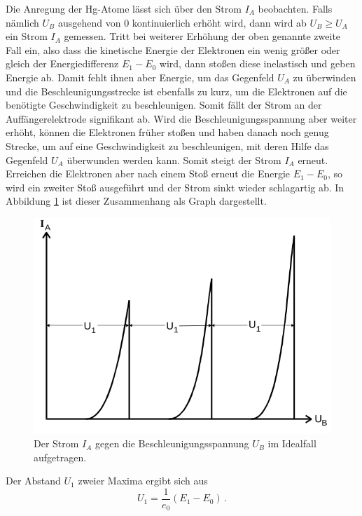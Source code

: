 Die Anregung der Hg-Atome lässt sich über den Strom $I_A$ beobachten. Falls nämlich
$U_B$ ausgehend von 0 kontinuierlich erhöht wird, dann wird ab $U_B \geq U_A$ ein
Strom $I_A$ gemessen. Tritt bei weiterer Erhöhung der oben genannte zweite Fall ein,
also dass die kinetische Energie der Elektronen ein wenig größer oder gleich der Energiedifferenz
$E_1 - E_0$ wird, dann stoßen diese inelastisch und geben Energie ab. Damit fehlt ihnen
aber Energie, um das Gegenfeld $U_A$ zu überwinden und die Beschleunigungsstrecke ist ebenfalls
zu kurz, um die Elektronen auf die benötigte Geschwindigkeit zu beschleunigen. Somit
fällt der Strom an der Auffängerelektrode signifikant ab. Wird die Beschleunigungsspannung
aber weiter erhöht, können die Elektronen früher stoßen und haben danach noch genug Strecke,
um auf eine Geschwindigkeit zu beschleunigen, mit deren Hilfe das Gegenfeld $U_A$
überwunden werden kann. Somit steigt der Strom $I_A$ erneut.
Erreichen die Elektronen aber nach einem Stoß erneut die Energie
$E_1 - E_0$, so wird ein zweiter Stoß ausgeführt und der Strom sinkt wieder schlagartig
ab. In Abbildung \ref{fig:2} ist dieser Zusammenhang als Graph dargestellt.
\begin{figure}[h]
  \centering
  \includegraphics[scale=0.35]{strom.png}
  \caption{Der Strom $I_A$ gegen die Beschleunigungsspannung $U_B$ im Idealfall aufgetragen. \cite{anleitung}}
  \label{fig:2}
\end{figure}
Der Abstand $U_1$ zweier Maxima ergibt sich aus
\begin{equation}
  U_1 = \frac{1}{e_0} (E_1 - E_0) \, .
  \label{eqn:1}
\end{equation}


